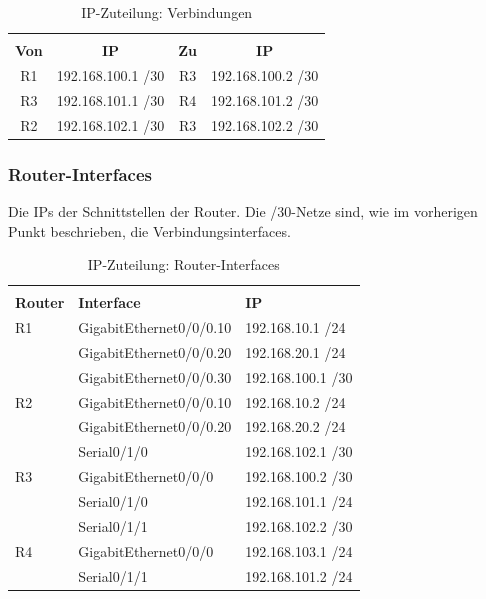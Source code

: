 \documentclass[a4paper, ngerman]{article}
\begin{document}
\begin{table}[H]
    \caption{IP-Zuteilung: Verbindungen} %
    \centering %
    \begin{tabular}{c c c c} %
        \hline\hline
        \\
        \textbf{Von} & \textbf{IP}       & \textbf{Zu} & \textbf{IP}       \\ [0.5ex]
        \hline
        R1           & 192.168.100.1 /30 & R3          & 192.168.100.2 /30 \\ %
        R3           & 192.168.101.1 /30 & R4          & 192.168.101.2 /30 \\
        R2           & 192.168.102.1 /30 & R3          & 192.168.102.2 /30 \\ [1ex]
        \hline
    \end{tabular}
    \label{table:nonlin} %
\end{table}

\subsubsection{Router-Interfaces}
Die IPs der Schnittstellen der Router. Die /30-Netze sind, wie im vorherigen Punkt beschrieben, die Verbindungsinterfaces.
\begin{table}[H]
    \caption{IP-Zuteilung: Router-Interfaces} %
    \centering %
    \begin{tabular}{l l l} %
        \hline\hline
        \\
        \textbf{Router} & \textbf{Interface}      & \textbf{IP}       \\ [0.5ex]
        \hline
        R1              & GigabitEthernet0/0/0.10 & 192.168.10.1 /24  \\
                        & GigabitEthernet0/0/0.20 & 192.168.20.1 /24  \\
                        & GigabitEthernet0/0/0.30 & 192.168.100.1 /30 \\[1ex]
        R2              & GigabitEthernet0/0/0.10 & 192.168.10.2 /24  \\
                        & GigabitEthernet0/0/0.20 & 192.168.20.2 /24  \\
                        & Serial0/1/0             & 192.168.102.1 /30 \\[1ex]
        R3              & GigabitEthernet0/0/0    & 192.168.100.2 /30 \\
                        & Serial0/1/0             & 192.168.101.1 /24 \\
                        & Serial0/1/1             & 192.168.102.2 /30 \\[1ex]
        R4              & GigabitEthernet0/0/0    & 192.168.103.1 /24 \\
                        & Serial0/1/1             & 192.168.101.2 /24 \\[1ex]
        \hline
    \end{tabular}
    \label{table:nonlin} %
\end{table}
\end{document}
